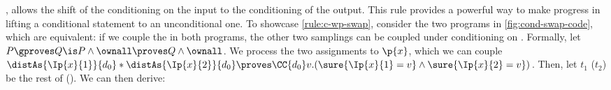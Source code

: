,
allows the shift of the conditioning on the input to the conditioning of the output.
This rule provides a powerful way to make progress in lifting
a conditional statement to an unconditional one.
To showcase \ref{rule:c-wp-swap},
consider the two programs in \cref{fig:cond-swap-code}, which
are equivalent:
if we couple the  in both programs,
the other two samplings can be coupled under conditioning on .
Formally, let $ P \gproves Q \is P \land \ownall \proves Q \land \ownall $.
We process the two assignments to $\p{x}$, which we can couple
$
  \distAs{\Ip{x}{1}}{d_0} *
  \distAs{\Ip{x}{2}}{d_0}
  \proves
  \CC{d_0} v.(\sure{\Ip{x}{1}=v} \land \sure{\Ip{x}{2}=v})
$.
Then, let $t_1$ ($t_2$) be the rest of  ().
We can then derive:
\par
\begin{derivation}
\end{derivation}
\vspace{\belowdisplayskip}


